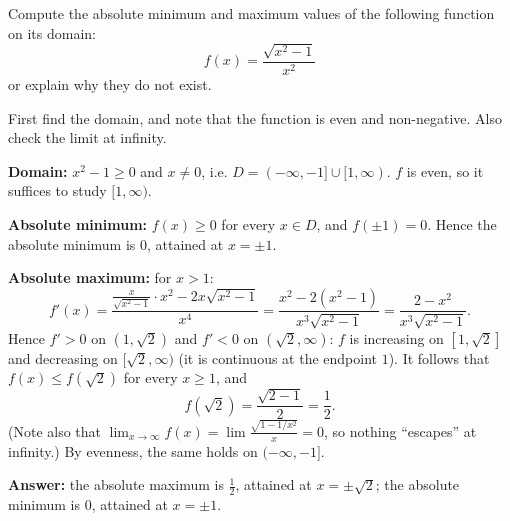 
\begin{question}
Compute the absolute minimum and maximum values of the following function on its domain:
\[ f(x)=\frac{\sqrt{x^2-1}}{x^2} \]
or explain why they do not exist.
\end{question}

\begin{hint}
First find the domain, and note that the function is even and non-negative. Also check the limit at infinity.
\end{hint}

\begin{solution}
\textbf{Domain:} $x^2-1\ge0$ and $x\neq0$, i.e. $D=(-\infty,-1]\cup[1,\infty)$.
$f$ is even, so it suffices to study $[1,\infty)$.

\textbf{Absolute minimum:} $f(x)\ge0$ for every $x\in D$, and $f(\pm1)=0$. Hence the absolute minimum is $\boxed{0}$, attained at $x=\pm1$.

\textbf{Absolute maximum:} for $x>1$:
\[ f'(x)=\frac{\frac{x}{\sqrt{x^2-1}}\cdot x^2-2x\sqrt{x^2-1}}{x^4}=\frac{x^2-2(x^2-1)}{x^3\sqrt{x^2-1}}=\frac{2-x^2}{x^3\sqrt{x^2-1}}. \]
Hence $f'>0$ on $(1,\sqrt2)$ and $f'<0$ on $(\sqrt2,\infty)$: $f$ is increasing on $[1,\sqrt2]$ and decreasing on $[\sqrt2,\infty)$ (it is continuous at the endpoint $1$). It follows that $f(x)\le f(\sqrt2)$ for every $x\ge1$, and
\[ f(\sqrt2)=\frac{\sqrt{2-1}}{2}=\frac12. \]
(Note also that $\lim_{x\to\infty}f(x)=\lim\frac{\sqrt{1-1/x^2}}{x}=0$, so nothing ``escapes'' at infinity.) By evenness, the same holds on $(-\infty,-1]$.

\textbf{Answer:} the absolute maximum is $\boxed{\tfrac12}$, attained at $x=\pm\sqrt2$; the absolute minimum is $\boxed{0}$, attained at $x=\pm1$.
\end{solution}
